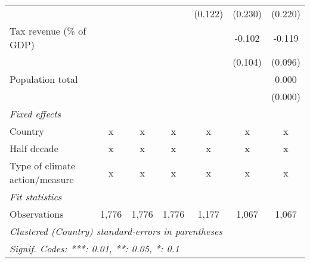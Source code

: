 \begin{tabular}{lcccccc}
                                                         &         &         &               & (0.122)       & (0.230)       & (0.220)\\   
   Tax revenue (\% of GDP)                               &         &         &               &               & -0.102        & -0.119\\   
                                                         &         &         &               &               & (0.104)       & (0.096)\\   
   Population total                                      &         &         &               &               &               & 0.000\\   
                                                         &         &         &               &               &               & (0.000)\\   
   \emph{Fixed effects}\\
   Country                                               & x       & x       & x             & x             & x             & x\\  
   Half decade                                           & x       & x       & x             & x             & x             & x\\  
   Type of climate action/measure                        & x       & x       & x             & x             & x             & x\\  
   \midrule \emph{Fit statistics}\\
   Observations                                          & 1,776   & 1,776   & 1,776         & 1,177         & 1,067         & 1,067\\  
   \midrule
   \multicolumn{7}{l}{\emph{Clustered (Country) standard-errors in parentheses}}\\
   \multicolumn{7}{l}{\emph{Signif. Codes: ***: 0.01, **: 0.05, *: 0.1}}\\
\end{tabular}
\par\endgroup


